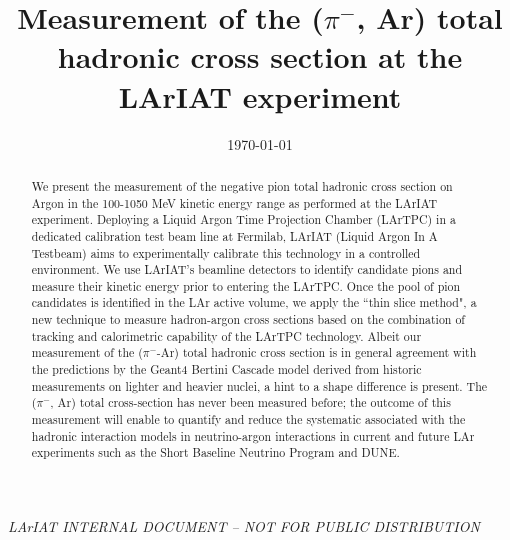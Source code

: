 \documentclass[aps,prl,twocolumn,showpacs,superscriptaddress,groupedaddress]{revtex4}  %
\begin{document}
\widetext
{}
\centerline{\em LArIAT INTERNAL DOCUMENT -- NOT FOR PUBLIC DISTRIBUTION}


\title{Measurement of the ($\pi^-$, Ar) total hadronic cross section at the LArIAT experiment}
\date{\today}


\begin{abstract}
We present the measurement of the negative pion total hadronic cross section on Argon in the 100-1050 MeV kinetic energy range as performed at the LArIAT experiment.   Deploying a Liquid Argon Time Projection Chamber (LArTPC) in a dedicated calibration test beam line at Fermilab, LArIAT (Liquid Argon In A Testbeam) aims to experimentally calibrate this technology in a controlled environment. We use LArIAT's beamline detectors to identify candidate pions and measure their kinetic energy prior to entering the LArTPC. Once the pool of pion candidates is identified in the LAr active volume, we apply the ``thin slice method", a new technique to measure hadron-argon cross sections based on the combination of tracking and calorimetric capability of the LArTPC technology. 
Albeit our measurement of the  ($\pi^-$-Ar) total hadronic cross section is in general agreement with the predictions by the Geant4 Bertini Cascade model derived from historic measurements on lighter and heavier nuclei, a hint to a shape difference is present.
The ($\pi^-$, Ar) total cross-section has never been measured before; the outcome of this measurement will enable to quantify and reduce the systematic associated with the hadronic interaction models in neutrino-argon interactions in current and future LAr experiments such as the Short Baseline Neutrino Program and DUNE.\\

 \end{abstract}
\end{document}
